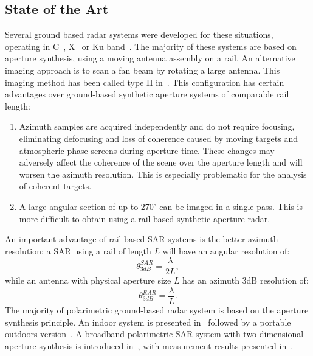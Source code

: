 \subsection{State of the Art}
Several ground based radar systems were developed for these situations, operating in C~\cite{Leva2003, Rudolf1999a,Kang2009}, X~\cite{Aguasca2004,Pipia2007a} or Ku band~\cite{Leva2003, Rudolf1999a,Werner2008, Rodelsperger2012}. The majority of these systems are based on aperture synthesis, using a moving antenna assembly on a rail. 
An alternative imaging approach is to scan a fan beam by rotating a large antenna\cite{Werner2008,werner_gpri_2012}. This imaging method has been called type II in~\cite{Caduff2015}. 
This configuration has certain advantages over ground-based synthetic aperture systems\cite{Monserrat2014} of comparable rail length: \begin{enumerate}
  \item Azimuth samples are acquired independently and do not require focusing, eliminating defocusing and loss of coherence caused by moving targets and atmospheric phase screens during aperture time. 
These changes may adversely affect the coherence of the scene over the aperture length and will worsen the azimuth resolution. This is especially problematic for the analysis of coherent targets.\\
 \item A large 
angular section of up to 270$^{\circ}$ can be imaged in a single pass. This is more difficult to obtain using a rail-based synthetic aperture radar.\\
\end{enumerate}
An important advantage of rail based SAR systems is the better azimuth resolution: a SAR using a rail of length $L$ will have an angular resolution of: 
\begin{equation}
 	\theta_{3dB}^{SAR} = \frac{\lambda}{2L},
\end{equation}
while an antenna with physical aperture size $L$ has an azimuth 3dB resolution of:
\begin{equation}
 	\theta_{3dB}^{RAR} = \frac{\lambda}{L}.
\end{equation}
The majority of polarimetric ground-based radar system is based on the aperture synthesis principle. An indoor system is presented in~\cite{Bennett1996} followed by a portable outdoors version~\cite{Bennett2000}. A broadband polarimetric SAR system with two dimensional aperture synthesis is introduced in~\cite{Zhou2004}, with measurement results presented in~\cite{Hamasaki2005}.
